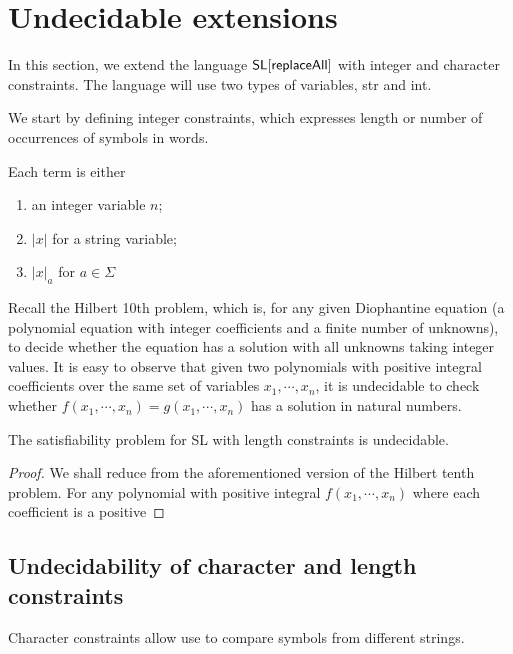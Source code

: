 
\section{Undecidable extensions}

In this section, we extend the language $\mathsf{SL}[\mathsf{replaceAll}]$ with integer and character constraints. The language will use two types of variables, str and int. 

We start by defining integer constraints, which expresses length or number of occurrences of symbols in words. 

\begin{definition}
	Each term is either 
	\begin{enumerate}
		\item an integer variable $n$;
		\item $|x|$ for a string variable;
		\item $|x|_a$ for $a\in \Sigma$
	\end{enumerate}
\end{definition}

Recall the Hilbert 10th problem, which is, for any given Diophantine equation (a polynomial equation with integer coefficients and a finite number of unknowns), to decide whether the equation has a solution with all unknowns taking integer values. It is easy to observe that given two polynomials with positive integral coefficients over the same set of variables $x_1, \cdots, x_n$, it is undecidable to check whether $f(x_1, \cdots, x_n)=g(x_1, \cdots, x_n)$ has a solution in natural numbers. 

\begin{theorem}
	The satisfiability problem for SL with length constraints is undecidable. 
\end{theorem}

\begin{proof}
	We shall reduce from the aforementioned version of the Hilbert tenth problem. For any polynomial with positive integral  $f(x_1, \cdots, x_n)$ where each coefficient is a positive 
\end{proof}

\subsection{Undecidability of character and length constraints}

Character constraints allow use to compare symbols from different strings. 

